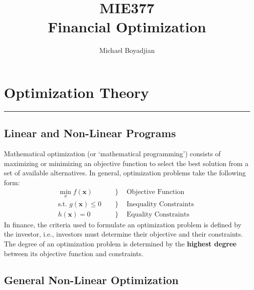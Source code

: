 \documentclass[11pt]{article}
\begin{document}
\title{MIE377  \\ Financial Optimization}
\author{Michael Boyadjian}
\maketitle
\pagebreak

\tableofcontents

\pagebreak

\bigskip
\bigskip
\bigskip


\section{Optimization Theory}
\hrule \vspace{15pt}
\subsection{Linear and Non-Linear Programs}
Mathematical optimization (or ‘mathematical programming’) consists of maximizing or minimizing an objective function to select the best solution from a set of available alternatives. In general, optimization problems take the following form: 
\begin{align*}
\min_x f(\bm{x}) & \quad  \left. \right\rbrace \quad \text{Objective Function } \\
\text{s.t.  }  g(\bm{x}) \leq 0 & \quad \left. \right\rbrace \quad \text{Inequality Constraints } \\ 
h(\bm{x}) = 0 & \quad \left. \right\rbrace \quad \text{Equality Constraints }
\end{align*}
In finance, the criteria used to formulate an optimization problem is defined by the investor, i.e., investors must determine their objective and their constraints.  The degree of an optimization problem is determined by the \textbf{highest degree} between its objective function and constraints.

\subsection{General Non-Linear Optimization}
\end{document}

